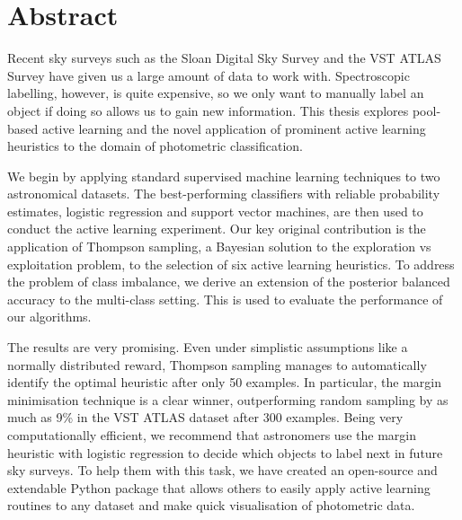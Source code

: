 
\chapter*{Abstract}
\label{cha:abstract}

Recent sky surveys such as the Sloan Digital Sky Survey and the VST ATLAS Survey have given us a large
amount of data to work with. Spectroscopic labelling, however, is quite expensive, so we only
want to manually label an object if doing so allows us to gain new information. This thesis
explores pool-based active learning and the novel application of prominent active learning heuristics to
the domain of photometric classification.

We begin by applying standard supervised machine learning techniques to two astronomical datasets.
The best-performing classifiers with reliable probability estimates, logistic regression and support
vector machines, are then used to conduct the active learning experiment. Our key original
contribution is the application of Thompson sampling, a Bayesian solution to the exploration vs
exploitation problem, to the selection of six active learning heuristics. To address the problem of
class imbalance, we derive an extension of the posterior balanced accuracy to the
multi-class setting. This is used to evaluate the performance of our algorithms.

The results are very promising. Even under simplistic assumptions like a normally distributed
reward, Thompson sampling manages to automatically identify the optimal heuristic after only 50
examples. In particular, the margin minimisation technique is a clear winner, outperforming random
sampling by as much as 9\% in the VST ATLAS dataset after 300 examples. Being very
computationally efficient, we recommend that astronomers use the margin heuristic with logistic
regression to decide which objects to label next in future sky surveys. To help them with this task,
we have created an open-source and extendable Python package that allows others to easily apply
active learning routines to any dataset and make quick visualisation of photometric data.



